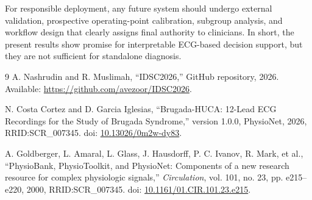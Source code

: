 \documentclass[10pt,twocolumn]{article}
\begin{document}
For responsible deployment, any future system should undergo external validation, prospective operating-point calibration, subgroup analysis, and workflow design that clearly assigns final authority to clinicians. In short, the present results show promise for interpretable ECG-based decision support, but they are not sufficient for standalone diagnosis.
\newpage
\begin{thebibliography}{9}
A. Nashrudin and R. Muslimah, ``IDSC2026,'' GitHub repository, 2026. Available: \href{https://github.com/avezoor/IDSC2026}{https://github.com/avezoor/IDSC2026}.

N. Costa Cortez and D. Garcia Iglesias, ``Brugada-HUCA: 12-Lead ECG Recordings for the Study of Brugada Syndrome,'' version 1.0.0, PhysioNet, 2026, RRID:SCR\_007345. doi: \href{https://doi.org/10.13026/0m2w-dy83}{10.13026/0m2w-dy83}.

A. Goldberger, L. Amaral, L. Glass, J. Hausdorff, P. C. Ivanov, R. Mark, et al., ``PhysioBank, PhysioToolkit, and PhysioNet: Components of a new research resource for complex physiologic signals,'' \emph{Circulation}, vol. 101, no. 23, pp. e215--e220, 2000, RRID:SCR\_007345. doi: \href{https://doi.org/10.1161/01.CIR.101.23.e215}{10.1161/01.CIR.101.23.e215}.
\end{thebibliography}
\end{document}
